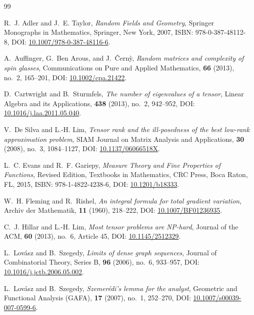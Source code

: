 \documentclass[11pt,a4paper,reqno]{amsart}
\theoremstyle{definition}
\numberwithin{equation}{section}
\begin{document}
\raggedbottom
\begin{thebibliography}{99}

R.~J. Adler and J.~E. Taylor,
\emph{Random Fields and Geometry},
Springer Monographs in Mathematics, Springer, New York, 2007, ISBN: 978-0-387-48112-8, DOI: \href{https://doi.org/10.1007/978-0-387-48116-6}{10.1007/978-0-387-48116-6}.

A.~Auffinger, G.~Ben Arous, and J.~{\v{C}}ern{\`y},
\emph{Random matrices and complexity of spin glasses},
Communications on Pure and Applied Mathematics, \textbf{66} (2013), no.~2, 165--201, DOI: \href{https://doi.org/10.1002/cpa.21422}{10.1002/cpa.21422}.

D.~Cartwright and B.~Sturmfels,
\emph{The number of eigenvalues of a tensor},
Linear Algebra and its Applications, \textbf{438} (2013), no.~2, 942--952, DOI: \href{https://doi.org/10.1016/j.laa.2011.05.040}{10.1016/j.laa.2011.05.040}.

V.~De Silva and L.-H. Lim,
\emph{Tensor rank and the ill-posedness of the best low-rank approximation problem},
SIAM Journal on Matrix Analysis and Applications, \textbf{30} (2008), no.~3, 1084--1127, DOI: \href{https://doi.org/10.1137/06066518X}{10.1137/06066518X}.

L.~C. Evans and R.~F. Gariepy,
\emph{Measure Theory and Fine Properties of Functions},
Revised Edition, Textbooks in Mathematics, CRC Press, Boca Raton, FL, 2015, ISBN: 978-1-4822-4238-6, DOI: \href{https://doi.org/10.1201/b18333}{10.1201/b18333}.

W.~H. Fleming and R.~Rishel,
\emph{An integral formula for total gradient variation},
Archiv der Mathematik, \textbf{11} (1960), 218--222, DOI: \href{https://doi.org/10.1007/BF01236935}{10.1007/BF01236935}.

C.~J. Hillar and L.-H. Lim,
\emph{Most tensor problems are NP-hard},
Journal of the ACM, \textbf{60} (2013), no.~6, Article 45, DOI: \href{https://doi.org/10.1145/2512329}{10.1145/2512329}.

L.~Lov{\'a}sz and B.~Szegedy,
\emph{Limits of dense graph sequences},
Journal of Combinatorial Theory, Series B, \textbf{96} (2006), no.~6, 933--957, DOI: \href{https://doi.org/10.1016/j.jctb.2006.05.002}{10.1016/j.jctb.2006.05.002}.

L.~Lov{\'a}sz and B.~Szegedy,
\emph{Szemer{\'e}di's lemma for the analyst},
Geometric and Functional Analysis (GAFA), \textbf{17} (2007), no.~1, 252--270, DOI: \href{https://doi.org/10.1007/s00039-007-0599-6}{10.1007/s00039-007-0599-6}.


\end{thebibliography}
\end{document}
